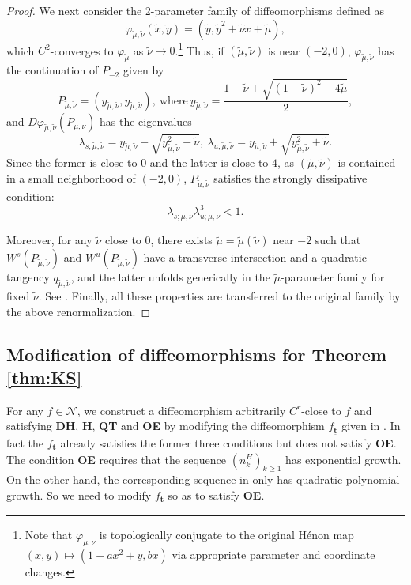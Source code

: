 \documentclass{amsart}
\theoremstyle{plain}
\theoremstyle{definition}
\theoremstyle{remark}
\numberwithin{equation}{section}
\begin{document}
\begin{proof}
We next consider the 2-parameter family of diffeomorphisms defined as
$$\varphi_{\tilde\mu,\tilde\nu}(\tilde{x},\tilde{y})=( \tilde{y}, \tilde{y}^{2}+\tilde{\nu} \tilde{x}+\tilde{\mu}), 
$$ 
which $C^{2}$-converges to $\varphi_{\tilde{\mu}}$ as $\tilde\nu\to 0$.\footnote{Note that $\varphi_{\mu,\nu}$ is 
topologically conjugate to the original H\'enon map $(x,y)\mapsto (1-ax^2+y, bx)$ via 
appropriate parameter and coordinate changes. } 
Thus, if $(\tilde\mu,\tilde\nu)$ is near $(-2,0)$,
$\varphi_{\tilde\mu,\tilde\nu}$ has the continuation of $P_{-2}$ given by
\[P_{\tilde\mu,\tilde\nu}=(y_{\tilde\mu,\tilde\nu}, y_{\tilde\mu,\tilde\nu}),\ \text{where}\ 
y_{\tilde\mu,\tilde\nu}=\frac{1-\tilde\nu+\sqrt{(1-\tilde\nu)^{2}-4\tilde\mu}}{2},\] 
and $D\varphi_{\tilde\mu,\tilde\nu}(P_{\tilde\mu,\tilde\nu})$ has the eigenvalues 
\[
\lambda_{s; \tilde\mu,\tilde\nu}=y_{\tilde\mu,\tilde\nu}-\sqrt{y_{\tilde\mu,\tilde\nu}^{2}+\tilde\nu},\ 
\lambda_{u; \tilde\mu,\tilde\nu}=y_{\tilde\mu,\tilde\nu}+\sqrt{y_{\tilde\mu,\tilde\nu}^{2}+\tilde\nu}.
\]
Since
the former is close to $0$ and the latter is close to $4$, as $(\tilde\mu,\tilde\nu)$ is contained in a small neighborhood of  $(-2,0)$, 
$P_{\tilde\mu,\tilde\nu}$ satisfies the strongly dissipative condition: 
\[\lambda_{s; \tilde\mu,\tilde\nu} \lambda^3_{u; \tilde\mu,\tilde\nu}<1.\]

Moreover, for any $\tilde\nu$ close to $0$, there exists
$\tilde\mu=\tilde\mu(\tilde\nu)$ near $-2$ such that
$W^{s}(P_{\tilde\mu,\tilde\nu})$ and $W^{u}(P_{\tilde\mu,\tilde\nu})$
have a transverse intersection and a quadratic tangency
$q_{\tilde\mu,\tilde\nu}$, and the latter unfolds generically in the
$\tilde\mu$-parameter family for fixed $\tilde\nu$.
See \cite[Proposition 3.2]{kls}.
Finally, all these properties are transferred to the original family
by the above renormalization.
\end{proof}

\subsection{Modification of diffeomorphisms for Theorem \ref{thm:KS}}
For any $f\in \mathcal{N}$, we construct a diffeomorphism arbitrarily $C^r$-close to $f$ and satisfying {\bf DH}, {\bf H}, {\bf QT} and {\bf OE} by 
modifying the diffeomorphism $f_{\underline{\boldsymbol{t}}}$ 
given in \cite[Section 7]{KS2017}.
In fact the $f_{\underline{\boldsymbol{t}}}$ already satisfies the former three conditions but does not satisfy {\bf OE}.
The condition {\bf OE} requires that the sequence $(n_k^H)_{k\geq 1}$ has exponential growth.
On the other hand,  
the corresponding sequence in \cite{KS2017} only has quadratic polynomial growth.
So we need to modify $f_{\underline{\boldsymbol{t}}}$ so as to satisfy {\bf OE}.
\end{document}
